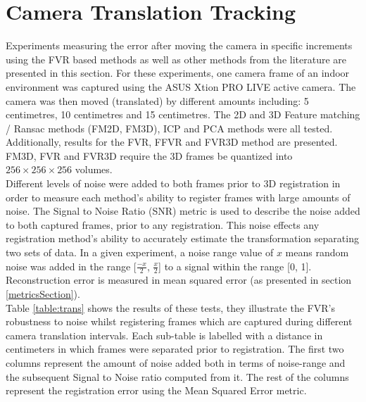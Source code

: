 \section{Camera Translation Tracking}
\label{Sec:CamTransTrackExp}

Experiments measuring the error after moving the camera in specific increments using the FVR based methods as well as other methods from the literature are presented in this section. For these experiments, one camera frame of an indoor environment was captured using the ASUS Xtion PRO LIVE active camera. The camera was then moved (translated) by different amounts including: 5 centimetres, 10 centimetres and 15 centimetres. The 2D and 3D Feature matching / Ransac methods (FM2D, FM3D), ICP and PCA methods were all tested. Additionally, results for the FVR, FFVR and FVR3D method are presented. FM3D, FVR and FVR3D require the 3D frames be quantized into $256\times 256\times 256$ volumes. \\

Different levels of noise were added to both frames prior to 3D registration in order to measure each method's ability to register frames with large amounts of noise. The Signal to Noise Ratio (SNR) metric is used to describe the noise added to both captured frames, prior to any registration. This noise effects any registration method's ability to accurately estimate the transformation separating two sets of data. In a given experiment, a noise range value of $x$ means random noise was added in the range [$\frac{-x}{2}$, $\frac{x}{2}$] to a signal within the range [0, 1]. Reconstruction error is measured in mean squared error (as presented in section \ref{metricsSection}). \\

Table \ref{table:trans} shows the results of these tests, they illustrate the FVR's robustness to noise whilst registering frames which are captured during different camera translation intervals. Each sub-table is labelled with a distance in centimeters in which frames were separated prior to registration. The first two columns represent the amount of noise added both in terms of noise-range and the subsequent Signal to Noise ratio computed from it. The rest of the columns represent the registration error using the Mean Squared Error metric.  \\

